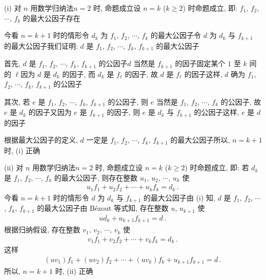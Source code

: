 \begin{pf}
    (i) 对 $n$ 用数学归纳法\period $n = 2$ 时, 命题成立\period 设 $n = k$ ($k \geq 2$) 时命题成立, 即: $f_1$, $f_2$, $\cdots$, $f_k$ 的最大公因子存在\period

    今看 $n = k+1$ 时的情形\period 令 $d_k$ 为 $f_1$, $f_2$, $\cdots$, $f_k$ 的最大公因子\period 令 $d$ 为 $d_k$ 与 $f_{k+1}$ 的最大公因子\period 我们证明: $d$ 是 $f_1$, $f_2$, $\cdots$, $f_k$, $f_{k+1}$ 的最大公因子\period

    首先, $d$ 是 $f_1$, $f_2$, $\cdots$, $f_k$, $f_{k+1}$ 的公因子\period $d$ 当然是 $f_{k+1}$ 的因子\period 固定某个 $1$ 至 $k$ 间的 $\ell$\period 因为 $d$ 是 $d_k$ 的因子, 而 $d_k$ 是 $f_{\ell}$ 的因子, 故 $d$ 是 $f_{\ell}$ 的因子\period 这样, $d$ 确为 $f_1$, $f_2$, $\cdots$, $f_k$, $f_{k+1}$ 的公因子\period

    其次, 若 $e$ 是 $f_1$, $f_2$, $\cdots$, $f_k$, $f_{k+1}$ 的公因子, 则 $e$ 当然是 $f_1$, $f_2$, $\cdots$, $f_{k}$ 的公因子, 故 $e$ 是 $d_k$ 的因子\period 又因为 $e$ 是 $f_{k+1}$ 的因子, 则 $e$ 是 $d_k$ 与 $f_{k+1}$ 的公因子\period 这样, $e$ 是 $d$ 的因子\period

    根据最大公因子的定义, $d$ 一定是 $f_1$, $f_2$, $\cdots$, $f_k$, $f_{k+1}$ 的最大公因子\period 所以, $n = k+1$ 时, (i) 正确\period

    (ii) 对 $n$ 用数学归纳法\period $n = 2$ 时, 命题成立\period 设 $n = k$ ($k \geq 2$) 时命题成立, 即: 若 $d_k$ 是 $f_1$, $f_2$, $\cdots$, $f_k$ 的最大公因子, 则存在整数 $u_1$, $u_2$, $\cdots$, $u_k$ 使
    \begin{align*}
        u_1 f_1 + u_2 f_2 + \cdots + u_k f_k = d_k \period
    \end{align*}
    今看 $n = k+1$ 时的情形\period 令 $d$ 为 $d_k$ 与 $f_{k+1}$ 的最大公因子\period 由 (i) 知, $d$ 是 $f_1$, $f_2$, $\cdots$, $f_k$, $f_{k+1}$ 的最大公因子\period 由 Bézout 等式知, 存在整数 $u$, $u_{k+1}$ 使
    \begin{align*}
        u d_k + u_{k+1} f_{k+1} = d \period
    \end{align*}
    根据归纳假设, 存在整数 $v_1$, $v_2$, $\cdots$, $v_k$ 使
    \begin{align*}
        v_1 f_1 + v_2 f_2 + \cdots + v_k f_k = d_k \period
    \end{align*}
    这样
    \begin{align*}
        (uv_1) f_1 + (uv_2) f_2 + \cdots + (uv_k) f_k + u_{k+1} f_{k+1} = d \period
    \end{align*}
    所以, $n = k+1$ 时, (ii) 正确\period
\end{pf}

